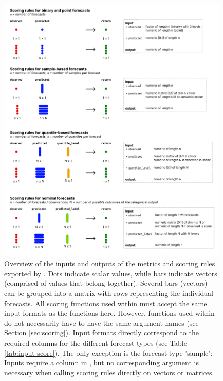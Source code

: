 \documentclass[
]{jss}
\begin{document}
\begin{CodeChunk}
\begin{figure}[!h]

{\centering \includegraphics[width=1\linewidth]{../../man/figures/input-formats-scoring-rules} 

}

\caption{Overview of the inputs and outputs of the metrics and scoring rules exported by . Dots indicate scalar values, while bars indicate vectors (comprised of values that belong together). Several bars (vectors) can be grouped into a matrix with rows representing the individual forecasts. All scoring functions used within  must accept the same input formats as the functions here. However, functions used within  do not necessarily have to have the same argument names (see Section \ref{sec:scoring}). Input formats directly correspond to the required columns for the different forecast types (see Table \ref{tab:input-score}). The only exception is the forecast type 'sample': Inputs require a column  in , but no corresponding argument is necessary when calling scoring rules directly on vectors or matrices.}\label{fig:input-scoring-rules}
\end{figure}
\end{CodeChunk}
\end{document}
